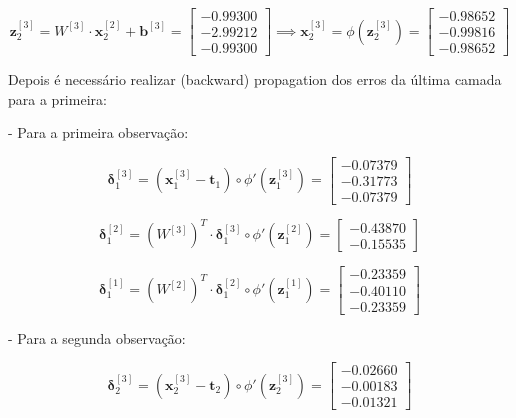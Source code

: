 \documentclass[a4paper,12pt]{article} %
\begin{document}
\begin{enumerate}
\begin{equation*}
    \textbf{z}^{[3]}_2 = W^{[3]} \cdot \textbf{x}^{[2]}_2 + \textbf{b}^{[3]} = \begin{bmatrix} -0.99300 \\ -2.99212 \\ -0.99300 \end{bmatrix} \implies \textbf{x}^{[3]}_2 = \phi(\textbf{z}^{[3]}_2)= \begin{bmatrix} -0.98652 \\ -0.99816\\ -0.98652 \end{bmatrix}
\end{equation*}

Depois é necessário realizar (backward) propagation dos erros da última camada para a primeira:

- Para a primeira observação:

\begin{equation*}
    \bm{\delta}^{[3]}_1 = (\textbf{x}^{[3]}_1 - \textbf{t}_1) \circ \phi'(\textbf{z}^{[3]}_1) = \begin{bmatrix} -0.07379 \\ -0.31773 \\ -0.07379 \end{bmatrix}
\end{equation*}

\begin{equation*}
    \bm{\delta}^{[2]}_1 = (W^{[3]})^T \cdot \bm{\delta}^{[3]}_1 \circ \phi'(\textbf{z}^{[2]}_1) = \begin{bmatrix} -0.43870\\ -0.15535 \end{bmatrix}
\end{equation*}

\begin{equation*}
    \bm{\delta}^{[1]}_1 = (W^{[2]})^T \cdot \bm{\delta}^{[2]}_1 \circ \phi'(\textbf{z}^{[1]}_1) = \begin{bmatrix} -0.23359 \\ -0.40110 \\ -0.23359 \end{bmatrix}
\end{equation*}

- Para a segunda observação:

\begin{equation*}
    \bm{\delta}^{[3]}_2 = (\textbf{x}^{[3]}_2 - \textbf{t}_2) \circ \phi'(\textbf{z}^{[3]}_2) = \begin{bmatrix} -0.02660 \\ -0.00183 \\ -0.01321 \end{bmatrix}
\end{equation*}


\end{enumerate}
\end{document}
